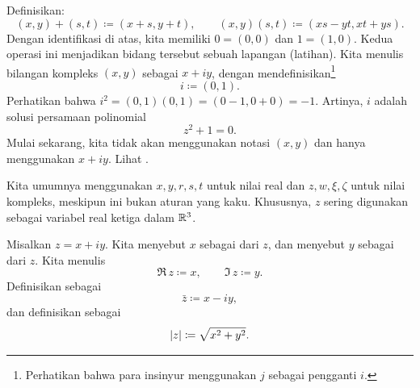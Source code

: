 Definisikan:
\begin{equation*}
(x,y) + (s,t) \coloneqq (x+s,y+t) , \qquad
(x,y) (s,t) \coloneqq (xs-yt,xt+ys) .
\end{equation*}
Dengan identifikasi di atas, kita memiliki $0 = (0,0)$ dan $1 = (1,0)$.
Kedua operasi ini menjadikan bidang tersebut sebuah lapangan (latihan).
Kita menulis bilangan kompleks $(x,y)$ sebagai $x+iy$, dengan
mendefinisikan\footnote{Perhatikan bahwa para insinyur menggunakan $j$ sebagai pengganti $i$.}
\begin{equation*}
i \coloneqq (0,1) .
\end{equation*}
Perhatikan bahwa $i^2 = (0,1)(0,1) = (0-1,0+0) = -1$.
Artinya, $i$ adalah solusi persamaan polinomial
\begin{equation*}
z^2+1=0 .
\end{equation*}
Mulai sekarang, kita tidak akan menggunakan notasi $(x,y)$ dan hanya menggunakan $x+iy$.
Lihat .
\begin{myfigureht}
\caption{Titik-titik $1$, $i$, $x$, $iy$, dan $x+iy$ pada bidang
kompleks.\label{fig:complexplane}}
\end{myfigureht}

Kita umumnya menggunakan $x,y,r,s,t$ untuk nilai real dan $z,w,\xi,\zeta$
untuk nilai kompleks, meskipun ini bukan aturan yang kaku. Khususnya,
$z$ sering digunakan sebagai variabel real ketiga dalam ${\mathbb{R}}^3$.

\begin{defn}
Misalkan $z= x+iy$.
Kita menyebut $x$ 
sebagai \emph{} dari $z$, dan 
menyebut $y$
sebagai \emph{} dari $z$. Kita menulis
\begin{equation*}
\Re\, z \coloneqq x , \qquad
\Im\, z \coloneqq y .
\end{equation*}
Definisikan
\emph{} sebagai
\begin{equation*}
\bar{z} \coloneqq x-iy ,
\end{equation*}
dan definisikan \emph{} sebagai
\begin{equation*}
\lvert {z} \rvert \coloneqq \sqrt{x^2+y^2} .
\end{equation*}
\end{defn}

